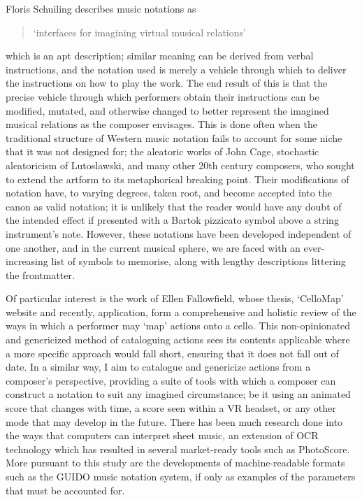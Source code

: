 Floris Schuiling describes music notations as \begin{quotation}
`interfaces for imagining virtual musical relations'
\end{quotation}
which is an apt description; similar meaning can be derived from verbal instructions, and the notation used is merely a vehicle through which to deliver the instructions on how to play the work.
The end result of this is that the precise vehicle through which performers obtain their instructions can be modified, mutated, and otherwise changed to better represent the imagined musical relations as the composer envisages.
This is done often when the traditional structure of Western music notation fails to account for some niche that it was not designed for; the aleatoric works of John Cage, stochastic aleatoricism of Lutoslawski, and many other 20th century composers, who sought to extend the artform to its metaphorical breaking point.
Their modifications of notation have, to varying degrees, taken root, and become accepted into the canon as valid notation; it is unlikely that the reader would have any doubt of the intended effect if presented with a Bartok pizzicato symbol above a string instrument's note.
However, these notations have been developed independent of one another, and in the current musical sphere, we are faced with an ever-increasing list of symbols to memorise, along with lengthy descriptions littering the frontmatter.

Of particular interest is the work of Ellen Fallowfield, whose thesis, `CelloMap' website and recently, application, form a comprehensive and holistic review of the ways in which a performer may `map' actions onto a cello.\autocite[]{fallowfieldCelloMapHandbook2009,fallowfieldCelloMap}
This non-opinionated and genericized method of cataloguing actions sees its contents applicable where a more specific approach would fall short, ensuring that it does not fall out of date.
In a similar way, I aim to catalogue and genericize actions from a composer's perspective, providing a suite of tools with which a composer can construct a notation to suit any imagined circumstance; be it using an animated score that changes with time, a score seen within a VR headset, or any other mode that may develop in the future.
There has been much research done into the ways that computers can interpret sheet music, an extension of OCR technology which has resulted in several market-ready tools such as PhotoScore. 
More pursuant to this study are the developments of machine-readable formats such as the GUIDO music notation system, if only as examples of the parameters that must be accounted for.

